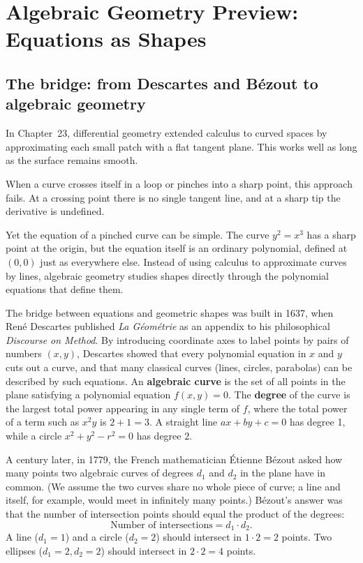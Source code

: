 \section{Algebraic Geometry Preview: Equations as Shapes}
\chapterline

\subsection{The bridge: from Descartes and Bézout to algebraic geometry}

In Chapter~23, differential geometry extended calculus to curved spaces by approximating each small patch with a flat tangent plane. This works well as long as the surface remains smooth.

When a curve crosses itself in a loop or pinches into a sharp point, this approach fails. At a crossing point there is no single tangent line, and at a sharp tip the derivative is undefined.

Yet the equation of a pinched curve can be simple. The curve $y^2 = x^3$ has a sharp point at the origin, but the equation itself is an ordinary polynomial, defined at $(0,0)$ just as everywhere else. Instead of using calculus to approximate curves by lines, algebraic geometry studies shapes directly through the polynomial equations that define them.

The bridge between equations and geometric shapes was built in 1637, when Ren\'e Descartes published \emph{La G\'eom\'etrie} as an appendix to his philosophical \emph{Discourse on Method}. By introducing coordinate axes to label points by pairs of numbers $(x, y)$, Descartes showed that every polynomial equation in $x$ and $y$ cuts out a curve, and that many classical curves (lines, circles, parabolas) can be described by such equations. An \textbf{algebraic curve} is the set of all points in the plane satisfying a polynomial equation $f(x, y) = 0$. The \textbf{degree} of the curve is the largest total power appearing in any single term of $f$, where the total power of a term such as $x^2y$ is $2 + 1 = 3$. A straight line $ax + by + c = 0$ has degree 1, while a circle $x^2 + y^2 - r^2 = 0$ has degree 2.

A century later, in 1779, the French mathematician \'{E}tienne B\'ezout asked how many points two algebraic curves of degrees $d_1$ and $d_2$ in the plane have in common. (We assume the two curves share no whole piece of curve; a line and itself, for example, would meet in infinitely many points.) B\'ezout's answer was that the number of intersection points should equal the product of the degrees:
\[
\text{Number of intersections} = d_1 \cdot d_2.
\]
A line ($d_1 = 1$) and a circle ($d_2 = 2$) should intersect in $1 \cdot 2 = 2$ points. Two ellipses ($d_1 = 2, d_2 = 2$) should intersect in $2 \cdot 2 = 4$ points.

